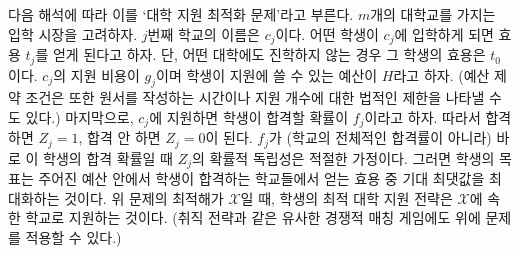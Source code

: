 \documentclass[11pt]{article} %
\newif\ifen
\theoremstyle{definition}
\theoremstyle{definition}
\begin{document}
\ifen
We refer to this problem as the \emph{optimal college application} problem, as follows. Consider an admissions market with $m$ colleges. The $j$th college is named $c_j$. Consider a single prospective student in this market, and let each $t_j$-value indicate the utility she associates with attending $c_j$, where her utility is $t_0$ if she does not attend college. Let $g_j$ denote the application fee for $c_j$ and $H$ the student's total budget to spend on application fees. (Alternatively, the budget constraint may represent the time needed to complete each application, or a legal limit on the number of applications permitted.) Lastly, let $f_j$ denote the student's probability of being admitted to $c_j$ if she applies, so that $Z_j$ equals one if she is admitted and zero if not. It is appropriate to assume that the $Z_j$ are statistically independent as long as $f_j$ are probabilities estimated specifically for this student (as opposed to generic acceptance rates). Then the student's objective is to maximize the expected utility associated with the best school she gets into within this budget. Therefore, her optimal college application strategy is given by the solution $\mathcal{X}$ to the problem above, where $\mathcal{X}$ represents the set of schools to which she applies. (The problem is also conformable to other competitive matching games such as job application.)
\else
다음 해석에 따라 이를 `대학 지원 최적화 문제'라고 부른다. $m$개의 대학교를 가지는 입학 시장을 고려하자. $j$번째 학교의 이름은 $c_j$이다. 어떤 학생이 $c_j$에 입학하게 되면 효용 $t_j$를 얻게 된다고 하자. 단, 어떤 대학에도 진학하지 않는 경우 그 학생의 효용은 $t_0$이다. $c_j$의 지원 비용이 $g_j$이며 학생이 지원에 쓸 수 있는 예산이 $H$라고 하자. (예산 제약 조건은 또한 원서를 작성하는 시간이나 지원 개수에 대한 법적인 제한을 나타낼 수도 있다.) 마지막으로, $c_j$에 지원하면 학생이 합격할 확률이 $f_j$이라고 하자. 따라서 합격하면 $Z_j = 1$, 합격 안 하면 $Z_j = 0$이 된다. $f_j$가 (학교의 전체적인 합격률이 아니라) 바로 이 학생의 합격 확률일 때 $Z_j$의 확률적 독립성은 적절한 가정이다. 그러면 학생의 목표는 주어진 예산 안에서 학생이 합격하는 학교들에서 얻는 효용 중 기대 최댓값을 최대화하는 것이다. 위 문제의 최적해가 $\mathcal{X}$일 때, 학생의 최적 대학 지원 전략은 $\mathcal{X}$에  속한 학교로 지원하는 것이다. (취직 전략과 같은 유사한 경쟁적 매칭 게임에도 위에 문제를 적용할 수 있다.)
\fi
\end{document}
